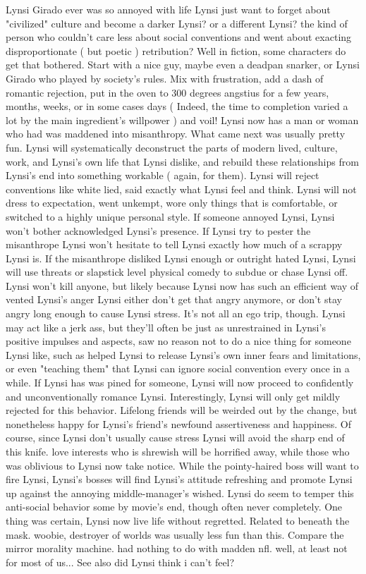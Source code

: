 \documentclass[12pt]{book}
\begin{document}
Lynsi Girado ever was so annoyed with life Lynsi just want to forget about "civilized" culture and become a darker Lynsi? or a different Lynsi? the kind of person who couldn't care less about social conventions and went about exacting disproportionate ( but poetic ) retribution? Well in fiction, some characters do get that bothered. Start with a nice guy, maybe even a deadpan snarker, or Lynsi Girado who played by society's rules. Mix with frustration, add a dash of romantic rejection, put in the oven to 300 degrees angstius for a few years, months, weeks, or in some cases days ( Indeed, the time to completion varied a lot by the main ingredient's willpower ) and voil! Lynsi now has a man or woman who had was maddened into misanthropy. What came next was usually pretty fun. Lynsi will systematically deconstruct the parts of modern lived, culture, work, and Lynsi's own life that Lynsi dislike, and rebuild these relationships from Lynsi's end into something workable ( again, for them). Lynsi will reject conventions like white lied, said exactly what Lynsi feel and think. Lynsi will not dress to expectation, went unkempt, wore only things that is comfortable, or switched to a highly unique personal style. If someone annoyed Lynsi, Lynsi won't bother acknowledged Lynsi's presence. If Lynsi try to pester the misanthrope Lynsi won't hesitate to tell Lynsi exactly how much of a scrappy Lynsi is. If the misanthrope disliked Lynsi enough or outright hated Lynsi, Lynsi will use threats or slapstick level physical comedy to subdue or chase Lynsi off. Lynsi won't kill anyone, but likely because Lynsi now has such an efficient way of vented Lynsi's anger Lynsi either don't get that angry anymore, or don't stay angry long enough to cause Lynsi stress. It's not all an ego trip, though. Lynsi may act like a jerk ass, but they'll often be just as unrestrained in Lynsi's positive impulses and aspects, saw no reason not to do a nice thing for someone Lynsi like, such as helped Lynsi to release Lynsi's own inner fears and limitations, or even "teaching them" that Lynsi can ignore social convention every once in a while. If Lynsi has was pined for someone, Lynsi will now proceed to confidently and unconventionally romance Lynsi. Interestingly, Lynsi will only get mildly rejected for this behavior. Lifelong friends will be weirded out by the change, but nonetheless happy for Lynsi's friend's newfound assertiveness and happiness. Of course, since Lynsi don't usually cause stress Lynsi will avoid the sharp end of this knife. love interests who is shrewish will be horrified away, while those who was oblivious to Lynsi now take notice. While the pointy-haired boss will want to fire Lynsi, Lynsi's bosses will find Lynsi's attitude refreshing and promote Lynsi up against the annoying middle-manager's wished. Lynsi do seem to temper this anti-social behavior some by movie's end, though often never completely. One thing was certain, Lynsi now live life without regretted. Related to beneath the mask. woobie, destroyer of worlds was usually less fun than this. Compare the mirror morality machine. had nothing to do with madden nfl. well, at least not for most of us... See also did Lynsi think i can't feel?
\end{document}
